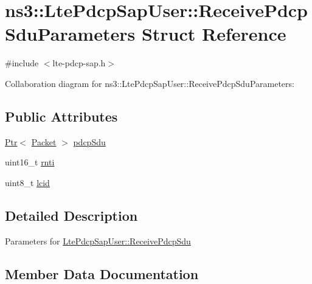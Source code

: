 \hypertarget{structns3_1_1LtePdcpSapUser_1_1ReceivePdcpSduParameters}{}\section{ns3\+:\+:Lte\+Pdcp\+Sap\+User\+:\+:Receive\+Pdcp\+Sdu\+Parameters Struct Reference}
\label{structns3_1_1LtePdcpSapUser_1_1ReceivePdcpSduParameters}


{\ttfamily \#include $<$lte-\/pdcp-\/sap.\+h$>$}



Collaboration diagram for ns3\+:\+:Lte\+Pdcp\+Sap\+User\+:\+:Receive\+Pdcp\+Sdu\+Parameters\+:
\subsection*{Public Attributes}
\begin{DoxyCompactItemize}
\item 
\hyperlink{classns3_1_1Ptr}{Ptr}$<$ \hyperlink{classns3_1_1Packet}{Packet} $>$ \hyperlink{structns3_1_1LtePdcpSapUser_1_1ReceivePdcpSduParameters_a569439666ecffa68800c963caa7b3a30}{pdcp\+Sdu}
\item 
uint16\+\_\+t \hyperlink{structns3_1_1LtePdcpSapUser_1_1ReceivePdcpSduParameters_ad1b85c52209f38aae0fa3cc9c45ecabe}{rnti}
\item 
uint8\+\_\+t \hyperlink{structns3_1_1LtePdcpSapUser_1_1ReceivePdcpSduParameters_a5bcd8bf2e6b8ebcab6125cfa58a3786c}{lcid}
\end{DoxyCompactItemize}


\subsection{Detailed Description}
Parameters for \hyperlink{classns3_1_1LtePdcpSapUser_a583987f2d64a552a2e5c0d7aa8ac461f}{Lte\+Pdcp\+Sap\+User\+::\+Receive\+Pdcp\+Sdu} 

\subsection{Member Data Documentation}
